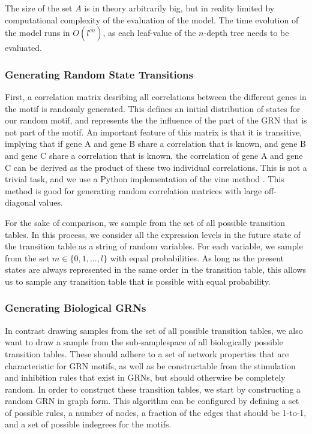 \documentclass[../main.tex]{subfiles}
\begin{document}
The size of the set $A$ is in theory arbitrarily big, but in reality limited by computational complexity of the evaluation of the model. 
The time evolution of the model runs in $O(l^{c \dot n})$, as each leaf-value of the $n$-depth tree needs to be evaluated. 

\subsubsection{Generating Random State Transitions}

First, a correlation matrix desribing all correlations between the different genes in the motif is randomly generated.
This defines an initial distribution of states for our random motif, and represents the the influence of the part of the GRN that is not part of the motif.
An important feature of this matrix is that it is transitive, implying that if gene A and gene B share a correlation that is known, and gene B and gene C share a correlation that is known, the correlation of gene A and gene C can be derived as the product of these two individual correlations.
This is not a trivial task, and we use a Python implementation of the vine method \cite{lewandowski2009generating}.
This method is good for generating random correlation matrices with large off-diagonal values.

For the sake of comparison, we sample from the set of all possible transition tables.
In this process, we consider all the expression levels in the future state of the transition table as a string of random variables.
For each variable, we sample from the set $m \in \{0, 1, ..., l\}$ with equal probabilities.
As long as the present states are always represented in the same order in the transition table, this allows us to sample any transition table that is possible with equal probability.

\subsubsection{Generating Biological GRNs}

In contrast drawing samples from the set of all possible transition tables, we also want to draw a sample from the sub-samplespace of all biologically possible transition tables.
These should adhere to a set of network properties that are characteristic for GRN motifs, as well as be constructable from the stimulation and inhibition rules that exist in GRNs, but should otherwise be completely random.
In order to construct these transition tables, we start by constructing a random GRN in graph form.
This algorithm can be configured by defining a set of possible rules, a number of nodes, a fraction of the edges that should be 1-to-1, and a set of possible indegrees for the motifs.
\end{document}
